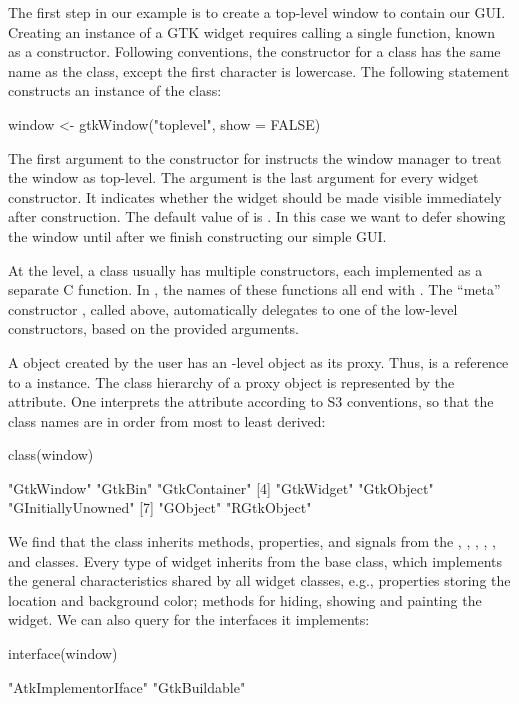 The first step in our example is to create a top-level window to
contain our GUI.  Creating an instance of a GTK\/ widget requires
calling a single \R\/ function, known as a constructor. Following \R\/
conventions, the constructor for a class has the same name as the
class, except the first character is lowercase. The following
statement constructs an instance of the  class:
\begin{Schunk}
\begin{Sinput}
 window <- gtkWindow("toplevel", show = FALSE)
\end{Sinput}
\end{Schunk}
%
The first argument to the constructor for  instructs
the window manager to treat the window as top-level.  The 
argument is the last argument for every widget constructor. It
indicates whether the widget should be made visible immediately after
construction.  The default value of  is . In
this case we want to defer showing the window until after we finish
constructing our simple GUI.

At the \GTK\/ level, a class usually has multiple constructors, each
implemented as a separate C function. In , the names of
these functions all end with . The ``meta'' constructor
, called above, automatically delegates to one of
the low-level constructors, based on the provided arguments.

A \GTK\/ object created by the \R\/ user has an \R-level object as its
proxy. Thus,  is a reference to a 
instance.  The class hierarchy of a proxy object is represented by the
 attribute. One interprets the attribute according to S3
conventions, so that the class names are in order from most to least
derived:
\begin{Schunk}
\begin{Sinput}
 class(window)
\end{Sinput}
\begin{Soutput}
[1] "GtkWindow"         "GtkBin"            "GtkContainer"     
[4] "GtkWidget"         "GtkObject"         "GInitiallyUnowned"
[7] "GObject"           "RGtkObject"       
\end{Soutput}
\end{Schunk}
%
We find that the  class inherits methods,
properties, and signals from the , ,
, , , and
 classes. Every type of  widget inherits from
the base  class, which implements the general
characteristics shared by all widget classes, e.g., properties storing
the location and background color; methods for hiding, showing and
painting the widget. We can also query  for the
interfaces it implements:
\begin{Schunk}
\begin{Sinput}
 interface(window)
\end{Sinput}
\begin{Soutput}
[1] "AtkImplementorIface" "GtkBuildable"       
\end{Soutput}
\end{Schunk}

